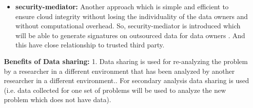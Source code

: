 \documentclass[11pt, pdftex, conference]{IEEEtran}
\begin{document}
\begin{itemize}
\item{\textbf{security-mediator:}}
Another approach which is simple and efficient to ensure cloud integrity without losing the individuality of the data owners and without computational overhead. So, security-mediator is introduced which will be able to generate signatures on outsourced data for data owners \cite{9}. And this have close relationship to trusted third party.
\end{itemize}
\textbf{Benefits of Data sharing:}
1. Data sharing is used for re-analyzing the problem by a researcher in a different environment that has been analyzed by another researcher in a different environment.. For secondary analysis data sharing is used (i.e. data collected for one set of problems will be used to analyze the new problem which does not have data).
\end{document}
